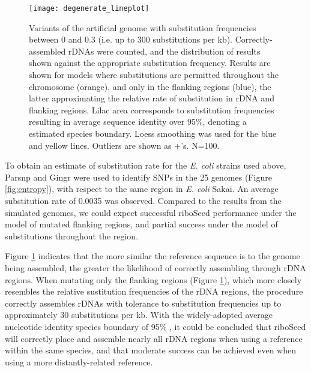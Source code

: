 \documentclass[a4,center,fleqn]{NAR}
\begin{document}
\begin{figure}[!b]
  \centering
    \texttt{[image: degenerate\_lineplot]}
  \caption{Variants of the artificial genome with substitution frequencies between 0 and 0.3 (i.e. up to 300 substitutions per kb). Correctly-assembled rDNAs were counted, and the distribution of results shown against the appropriate substitution frequency. Results are shown for models where substitutions are permitted throughout the chromosome (orange), and only in the flanking regions (blue), the latter approximating the relative rate of substitution in rDNA and flanking regions. Lilac area corresponds to substitution frequencies resulting in average sequence identity over 95\%, denoting a estimated species boundary. Loess smoothing was used for the blue and yellow lines. Outliers are shown as $+$'s. N=100.}
  \label{fig:degen}
\end{figure}


To obtain an estimate of substitution rate for the \textit{E. coli} strains used above, Parsnp\cite{Treangen2014} and Gingr\cite{Treangen2014} were used to identify SNPs in the 25 genomes (Figure \ref{fig:entropy}), with respect to the same region in \textit{E. coli} Sakai. An average substitution rate of 0.0035 was observed. Compared to the results from the simulated genomes, we could expect successful riboSeed performance under the model of mutated flanking regions, and partial success under the model of substitutions throughout the region.


Figure \ref{fig:degen} indicates that the more similar the reference sequence is to the genome being assembled, the greater the likelihood of correctly assembling through rDNA regions. When mutating only the flanking regions (Figure \ref{fig:degen}), which more closely resembles the relative sustitution frequencies of the rDNA regions, the procedure correctly assembles rDNAs with tolerance to substitution frequencies up to approximately 30 substitutions per kb.  With the widely-adopted average nucleotide identity species boundary of 95\% \cite{Goris2007a}, it could be concluded that riboSeed will correctly place and assemble nearly all rDNA regions when using a reference within the same species, and that moderate success can be achieved even when using a more distantly-related reference.
\end{document}
